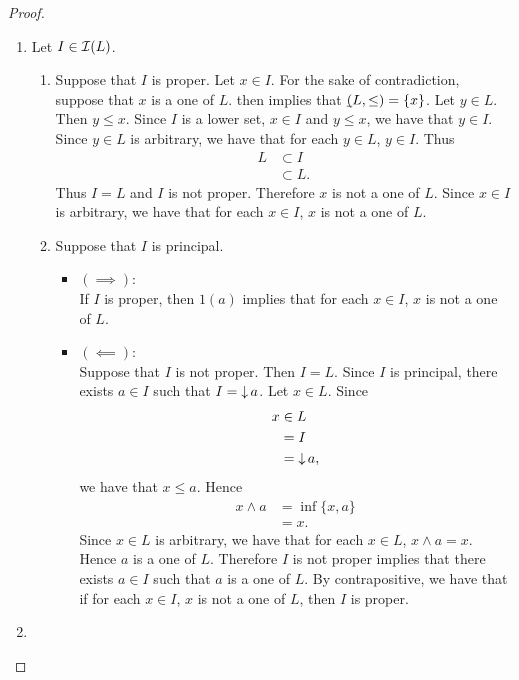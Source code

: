 \documentclass{book}
\begin{document}
	\begin{proof}\
		\begin{enumerate}
			\item Let $I \in \mathcal{I}(L)$.
			\begin{enumerate}
				\item Suppose that $I$ is proper. Let $x \in I$. For the sake of contradiction, suppose that $x$ is a one of $L$.  then implies that $\underbar{(}L, \leq) = \{x\}$. Let $y \in L$. Then $y \leq x$. Since $I$ is a lower set, $x \in I$ and $y \leq x$, we have that $y \in I$. Since $y \in L$ is arbitrary, we have that for each $y \in L$, $y \in I$. Thus 
				\begin{align*}
					L 
					& \subset I \\
					& \subset L.
				\end{align*}
				Thus $I = L$ and $I$ is not proper. Therefore $x$ is not a one of $L$. Since $x \in I$ is arbitrary, we have that for each $x \in I$, $x$ is not a one of $L$. 
				\item Suppose that $I$ is principal. 
				\begin{itemize}
					\item $(\implies)$: \\
					If $I$ is proper, then $1(a)$ implies that for each $x \in I$, $x$ is not a one of $L$.
					\item $(\impliedby)$: \\
					Suppose that $I$ is not proper. Then $I = L$. Since $I$ is principal, there exists $a \in I$ such that $I = \operatorname{\downarrow} a$. Let $x \in L$. Since
					\begin{align*}
						x
						& \in L \\
						& = I \\
						& = \operatorname{\downarrow} a,
					\end{align*} 
					we have that $x \leq a$. Hence 
					\begin{align*}
						x \wedge a
						& = \inf \{x, a\} \\
						& = x.
					\end{align*}
					Since $x \in L$ is arbitrary, we have that for each $x \in L$, $x \wedge a = x$. Hence $a$ is a one of $L$. Therefore $I$ is not proper implies that there exists $a \in I$ such that $a$ is a one of $L$. By contrapositive, we have that if for each $x \in I$, $x$ is not a one of $L$, then $I$ is proper. 
				\end{itemize}
			\end{enumerate}
			\item {}
		\end{enumerate}
	\end{proof}
	
\end{document}

